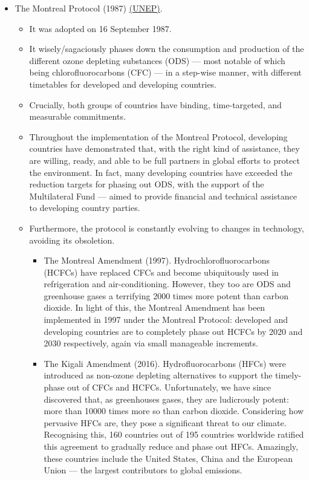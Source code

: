 \documentclass[oneside]{book}
\begin{document}
\begin{enumerate}
\begin{itemize}
\begin{itemize}
        \end{itemize}
        \item The Montreal Protocol (1987) \href{https://www.unep.org/ozonaction/who-we-are/about-montreal-protocol#:~:text=The%20Montreal%20Protocol&text=Adopted%20on%2016%20September%201987,treaties%20to%20achieve%20universal%20ratification.}{(UNEP)}.  
        \begin{itemize}
            \item It was adopted on 16 September 1987.
            \item It wisely/sagaciously phases down the consumption and production of the different ozone depleting substances (ODS) --- most notable of which being chlorofluorocarbons (CFC) --- in a step-wise manner, with different timetables for developed and developing countries.
            \item Crucially, both groups of countries have binding, time-targeted, and measurable commitments.
            \item Throughout the implementation of the Montreal Protocol, developing countries have demonstrated that, with the right kind of assistance, they are willing, ready, and able to be full partners in global efforts to protect the environment. In fact, many developing countries have exceeded the reduction targets for phasing out ODS, with the support of the Multilateral Fund --- aimed to provide financial and technical assistance to developing country parties.
            \item Furthermore, the protocol is constantly evolving to changes in technology, avoiding its obsoletion.
            \begin{itemize}
                \item The Montreal Amendment (1997). Hydrochlorofluorocarbons (HCFCs) have replaced CFCs and become ubiquitously used in refrigeration and air-conditioning. However, they too are ODS and greenhouse gases a terrifying 2000 times more potent than carbon dioxide. In light of this, the Montreal Amendment has been implemented in 1997 under the Montreal Protocol: developed and developing countries are to completely phase out HCFCs by 2020 and 2030 respectively, again via small manageable increments.
                \item The Kigali Amendment (2016). Hydrofluorocarbons (HFCs) were introduced as non-ozone depleting alternatives to support the timely-phase out of CFCs and HCFCs. Unfortunately, we have since discovered that, as greenhouses gases, they are ludicrously potent: more than 10000 times more so than carbon dioxide. Considering how pervasive HFCs are, they pose a significant threat to our climate. Recognising this, 160 countries out of 195 countries worldwide ratified this agreement to gradually reduce and phase out HFCs. Amazingly, these countries include the United States, China and the European Union --- the largest contributors to global emissions. 

\end{itemize}
\end{itemize}
\end{itemize}
\end{enumerate}
\end{document}
